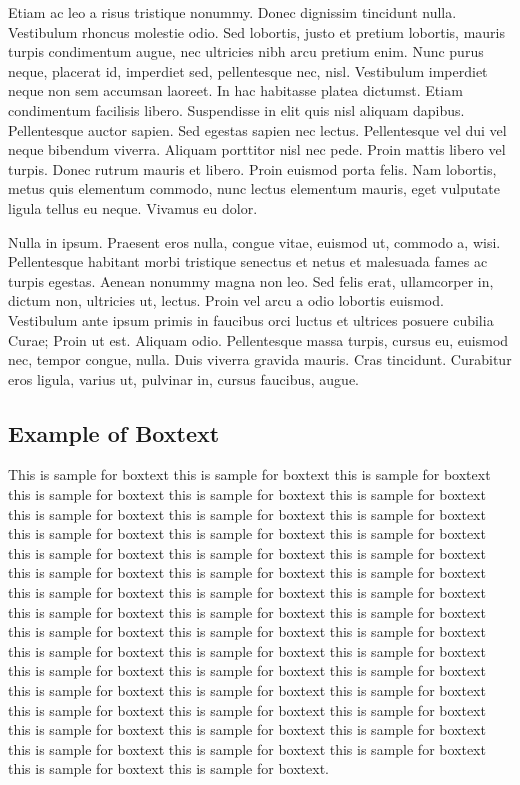 \documentclass[APA,LATO1COL]{WileyNJD-v2}
\begin{document}
Etiam ac leo a risus tristique nonummy. Donec dignissim tincidunt nulla. Vestibulum rhoncus molestie odio. Sed
lobortis, justo et pretium lobortis, mauris turpis condimentum augue, nec ultricies nibh arcu pretium enim. Nunc
purus neque, placerat id, imperdiet sed, pellentesque nec, nisl. Vestibulum imperdiet neque non sem accumsan laoreet.
In hac habitasse platea dictumst. Etiam condimentum facilisis libero. Suspendisse in elit quis nisl aliquam dapibus.
Pellentesque auctor sapien. Sed egestas sapien nec lectus. Pellentesque vel dui vel neque bibendum viverra. Aliquam
porttitor nisl nec pede. Proin mattis libero vel turpis. Donec rutrum mauris et libero. Proin euismod porta felis.
Nam lobortis, metus quis elementum commodo, nunc lectus elementum mauris, eget vulputate ligula tellus eu neque.
Vivamus eu dolor.

Nulla in ipsum. Praesent eros nulla, congue vitae, euismod ut, commodo a, wisi. Pellentesque habitant morbi
tristique senectus et netus et malesuada fames ac turpis egestas. Aenean nonummy magna non leo. Sed felis erat,
ullamcorper in, dictum non, ultricies ut, lectus. Proin vel arcu a odio lobortis euismod. Vestibulum ante ipsum primis
in faucibus orci luctus et ultrices posuere cubilia Curae; Proin ut est. Aliquam odio. Pellentesque massa turpis, cursus
eu, euismod nec, tempor congue, nulla. Duis viverra gravida mauris. Cras tincidunt. Curabitur eros ligula, varius ut,
pulvinar in, cursus faucibus, augue.



\begin{boxtext}
\section*{Example of Boxtext}%
This is sample for boxtext this is sample for boxtext this is sample for boxtext this is sample for boxtext this is sample for boxtext this is sample for boxtext this is sample for boxtext this is sample for boxtext this is sample for boxtext this is sample for boxtext this is sample for boxtext this is sample for boxtext this is sample for boxtext this is sample for boxtext this is sample for boxtext this is sample for boxtext this is sample for boxtext this is sample for boxtext this is sample for boxtext this is sample for boxtext this is sample for boxtext this is sample for boxtext this is sample for boxtext this is sample for boxtext this is sample for boxtext this is sample for boxtext this is sample for boxtext this is sample for boxtext this is sample for boxtext this is sample for boxtext this is sample for boxtext this is sample for boxtext this is sample for boxtext this is sample for boxtext this is sample for boxtext this is sample for boxtext this is sample for boxtext this is sample for boxtext this is sample for boxtext this is sample for boxtext this is sample for boxtext this is sample for boxtext this is sample for boxtext this is sample for boxtext this is sample for boxtext this is sample for boxtext this is sample for boxtext.
\end{boxtext}
\end{document}
